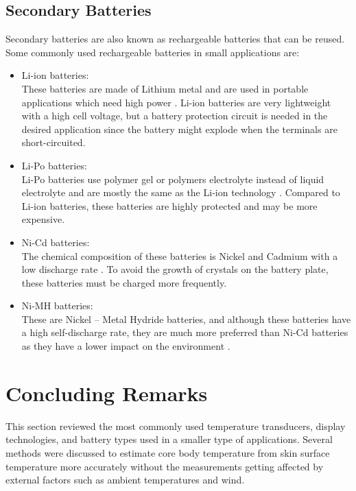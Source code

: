 \subsection{Secondary Batteries}
Secondary batteries are also known as rechargeable batteries that can be reused. Some commonly used rechargeable batteries in small applications are:
\begin{itemize}
	\item Li-ion batteries:\\
	These batteries are made of Lithium metal and are used in portable applications which need high power \cite{Components2019}. Li-ion batteries are very lightweight with a high cell voltage, but a battery protection circuit is needed in the desired application since the battery might explode when the terminals are short-circuited. 
	\item Li-Po batteries:\\
	Li-Po batteries use polymer gel or polymers electrolyte instead of liquid electrolyte and are mostly the same as the Li-ion technology \cite{Components2019}. Compared to Li-ion batteries, these batteries are highly protected and may be more expensive. 
	\item Ni-Cd batteries:\\
	The chemical composition of these batteries is Nickel and Cadmium with a low discharge rate \cite{Components2019}. To avoid the growth of crystals on the battery plate, these batteries must be charged more frequently.
	\item Ni-MH batteries:\\
	These are Nickel – Metal Hydride batteries, and although these batteries have a high self-discharge rate, they are much more preferred than Ni-Cd batteries as they have a lower impact on the environment \cite{Components2019}. 
\end{itemize}

\section{Concluding Remarks}
This section reviewed the most commonly used temperature transducers, display technologies, and battery types used in a smaller type of applications. Several methods were discussed to estimate core body temperature from skin surface temperature more accurately without the measurements getting affected by external factors such as ambient temperatures and wind.

